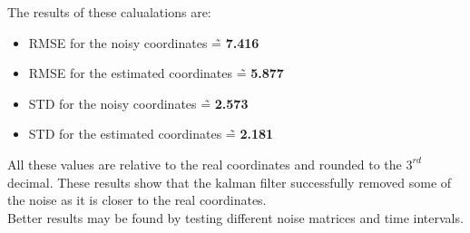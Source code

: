 \documentclass[conference]{IEEEtran}
\begin{document}
        The results of these calualations are:
        \begin{itemize}
            \item RMSE for the noisy coordinates \~= \textbf{7.416}
            \item RMSE for the estimated coordinates \~= \textbf{5.877}
            \item STD for the noisy coordinates \~= \textbf{2.573}
            \item STD for the estimated coordinates \~= \textbf{2.181}
        \end{itemize}
        All these values are relative to the real coordinates and rounded to the $3^{rd}$ decimal.
        These results show that the kalman filter successfully removed some of the noise as it is closer to the real coordinates.\\ 
        Better results may be found by testing different noise matrices and time intervals.
        
\newpage%
\appendix
\end{document}

